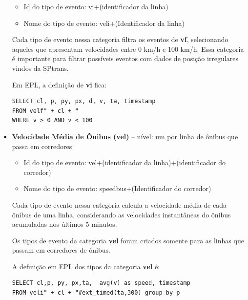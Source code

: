 \begin{itemize}
    \begin{itemize}
        \item Id do tipo de evento: vi+(identificador da linha)
        \item Nome do tipo de evento: veli+(Identificador da linha)
    \end{itemize}
    Cada tipo de evento nessa categoria filtra os eventos de \textbf{vf}, selecionando aqueles que apresentam velocidades entre 0 km/h e 100 km/h. Essa categoria é importante para filtrar possíveis eventos com dados de posição irregulares vindos da SPtrans. 
    
    Em EPL, a definição de \textbf{vi} fica: 
\begin{verbatim}
SELECT cl, p, py, px, d, v, ta, timestamp 
FROM velf" + cl + " 
WHERE v > 0 AND v < 100
\end{verbatim}


    \item \textbf{Velocidade Média de Ônibus (vel)} -- nível: um por linha de ônibus que passa em corredores
    
    \begin{itemize}
        \item Id do tipo de evento: vel+(identificador da linha)+(identificador do corredor)
        \item Nome do tipo de evento: speedbus+(Identificador do corredor)
    \end{itemize}
 
    Cada tipo de evento nessa categoria calcula a velocidade média de cada ônibus de uma linha, considerando as velocidades instantâneas do ônibus acumuladas nos últimos 5 minutos. 
    
    Os tipos de evento da categoria \textbf{vel} foram criados somente para as linhas que passam em corredores de ônibus.%
    
    A definição em EPL dos tipos da categoria \textbf{vel} é:
\begin{verbatim}
SELECT cl,p, py, px,ta,  avg(v) as speed, timestamp 
FROM veli" + cl + "#ext_timed(ta,300) group by p
\end{verbatim}



\end{itemize}
